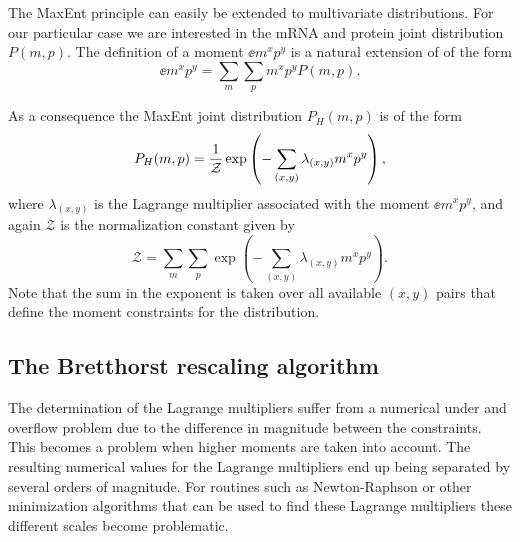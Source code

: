 The MaxEnt principle can easily be extended to multivariate distributions. For
our particular case we are interested in the mRNA and protein joint distribution
$P(m, p)$. The definition of a moment $\ee{m^x p^y}$ is a natural extension of
 of the form
\begin{equation}
  \ee{m^x p^y} = \sum_m \sum_p m^x p^y P(m, p).
\end{equation}

As a consequence the MaxEnt joint distribution $P_H(m, p)$ is of the form
\begin{equation}
  P_H(m, p) = {1 \over \mathcal{Z}}
              \exp \left( - \sum_{(x,y)} \lambda_{(x,y)} m^x p^y \right),
  \label{eq_maxEnt_joint}
\end{equation}
where $\lambda_{(x,y)}$ is the Lagrange multiplier associated with the moment
$\ee{m^x p^y}$, and again $\mathcal{Z}$ is the normalization constant given by
\begin{equation}
  \mathcal{Z} = \sum_m \sum_p
              \exp \left( - \sum_{(x, y)} \lambda_{(x, y)} m^x p^y \right).
\end{equation}
Note that the sum in the exponent is taken over all available $(x, y)$ pairs
that define the moment constraints for the distribution.

\subsection{The Bretthorst rescaling algorithm}

The determination of the Lagrange multipliers suffer from a numerical under and
overflow problem due to the difference in magnitude between the constraints.
This becomes a problem when higher moments are taken into account. The resulting
numerical values for the Lagrange multipliers end up being separated by several
orders of magnitude. For routines such as Newton-Raphson or other minimization
algorithms that can be used to find these Lagrange multipliers these different
scales become problematic.

